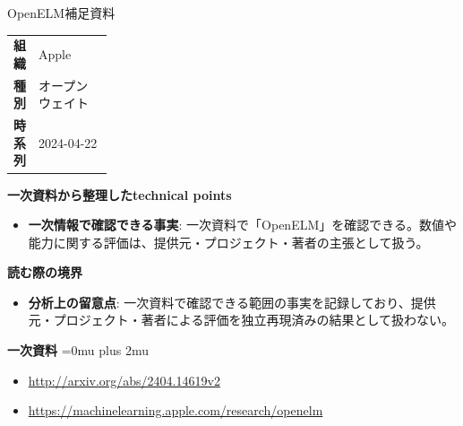 \begin{technicalnote}{OpenELM}{補足資料}
\begingroup
\begin{tabularx}{\linewidth}{@{}>{\bfseries}p{0.22\linewidth}X@{}}
組織 & Apple \\
種別 & オープンウェイト \\
時系列 & 2024-04-22 \\
\end{tabularx}
\smallskip
{\bfseries 一次資料から整理したtechnical points}
\begin{itemize}[leftmargin=1.5em,itemsep=0.35em]
\item \textbf{一次情報で確認できる事実}: 一次資料で「OpenELM」を確認できる。数値や能力に関する評価は、提供元・プロジェクト・著者の主張として扱う。
\end{itemize}
\begin{minipage}{\linewidth}
{\bfseries 読む際の境界}
\begin{itemize}[leftmargin=1.5em,itemsep=0.35em]
\item \textbf{分析上の留意点}: 一次資料で確認できる範囲の事実を記録しており、提供元・プロジェクト・著者による評価を独立再現済みの結果として扱わない。
\end{itemize}
\begin{samepage}
{\bfseries 一次資料}
\begingroup\sloppy
\Urlmuskip=0mu plus 2mu\relax
\begin{itemize}[leftmargin=1.5em,itemsep=0.25em]
\item {\scriptsize\url{http://arxiv.org/abs/2404.14619v2}}
\item {\scriptsize\url{https://machinelearning.apple.com/research/openelm}}
\end{itemize}
\endgroup
\end{samepage}
\end{minipage}
\endgroup
\end{technicalnote}
\medskip
